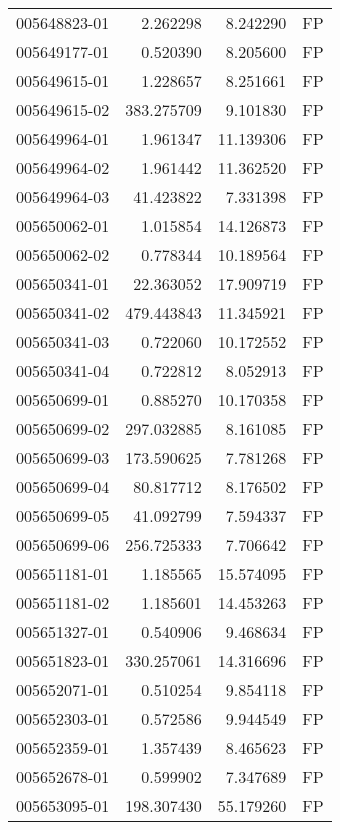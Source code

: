 \begin{tabular}{lrrl}
005648823-01 &    2.262298 &       8.242290 &   FP \\
005649177-01 &    0.520390 &       8.205600 &   FP \\
005649615-01 &    1.228657 &       8.251661 &   FP \\
005649615-02 &  383.275709 &       9.101830 &   FP \\
005649964-01 &    1.961347 &      11.139306 &   FP \\
005649964-02 &    1.961442 &      11.362520 &   FP \\
005649964-03 &   41.423822 &       7.331398 &   FP \\
005650062-01 &    1.015854 &      14.126873 &   FP \\
005650062-02 &    0.778344 &      10.189564 &   FP \\
005650341-01 &   22.363052 &      17.909719 &   FP \\
005650341-02 &  479.443843 &      11.345921 &   FP \\
005650341-03 &    0.722060 &      10.172552 &   FP \\
005650341-04 &    0.722812 &       8.052913 &   FP \\
005650699-01 &    0.885270 &      10.170358 &   FP \\
005650699-02 &  297.032885 &       8.161085 &   FP \\
005650699-03 &  173.590625 &       7.781268 &   FP \\
005650699-04 &   80.817712 &       8.176502 &   FP \\
005650699-05 &   41.092799 &       7.594337 &   FP \\
005650699-06 &  256.725333 &       7.706642 &   FP \\
005651181-01 &    1.185565 &      15.574095 &   FP \\
005651181-02 &    1.185601 &      14.453263 &   FP \\
005651327-01 &    0.540906 &       9.468634 &   FP \\
005651823-01 &  330.257061 &      14.316696 &   FP \\
005652071-01 &    0.510254 &       9.854118 &   FP \\
005652303-01 &    0.572586 &       9.944549 &   FP \\
005652359-01 &    1.357439 &       8.465623 &   FP \\
005652678-01 &    0.599902 &       7.347689 &   FP \\
005653095-01 &  198.307430 &      55.179260 &   FP \\

\end{tabular}
